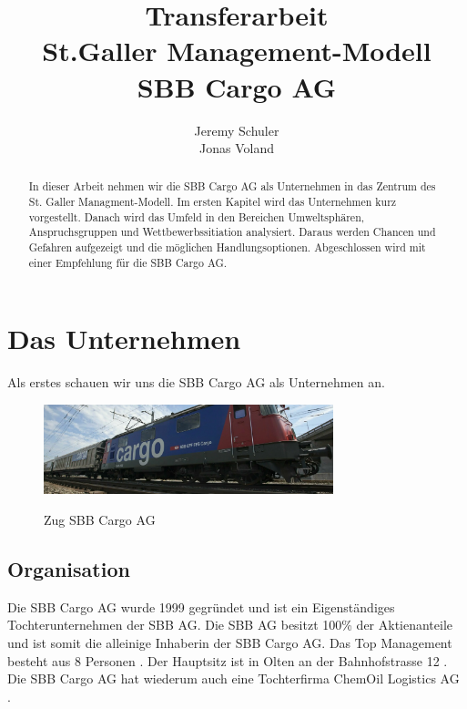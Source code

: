 \documentclass{article}
\title{
    Transferarbeit
    \\St.Galler Management-Modell
    \\SBB Cargo AG}
\author{
    Jeremy Schuler\\
    Jonas Voland
}
\begin{document}
\begin{titlepage}
    \maketitle
\end{titlepage}

\setcounter{page}{2}

\begin{abstract}
In dieser Arbeit nehmen wir die SBB Cargo AG als Unternehmen in das Zentrum des St. Galler Managment-Modell.
Im ersten Kapitel wird das Unternehmen kurz vorgestellt.
Danach wird das Umfeld in den Bereichen Umweltsphären, Anspruchsgruppen und Wettbewerbssitiation analysiert.
Daraus werden Chancen und Gefahren aufgezeigt und die möglichen Handlungsoptionen.
Abgeschlossen wird mit einer Empfehlung für die SBB Cargo AG.
\end{abstract}

\tableofcontents

\newpage

\section{Das Unternehmen}

Als erstes schauen wir uns die SBB Cargo AG als Unternehmen an.

\begin{figure}[htbp] %
    \centering
    \includegraphics[width=0.75\textwidth]{sbbcargoag} %
    \caption{Zug SBB Cargo AG}\parencite[o. S.]{sbbcargoagBild}
    \label{fig:bildlabel2}
\end{figure}

\subsection{Organisation}

Die SBB Cargo AG wurde 1999 gegründet und ist ein Eigenständiges Tochterunternehmen der SBB AG.
Die SBB AG besitzt 100\% der Aktienanteile und ist somit die alleinige Inhaberin der SBB Cargo AG.
Das Top Management besteht aus 8 Personen \parencite[o. S.]{managmentOrganigram}.
Der Hauptsitz ist in Olten an der Bahnhofstrasse 12 \parencite[o. S.]{standorte}.
Die SBB Cargo AG hat wiederum auch eine Tochterfirma ChemOil Logistics AG \parencite[o. S.]{chemOil}.
\end{document}
